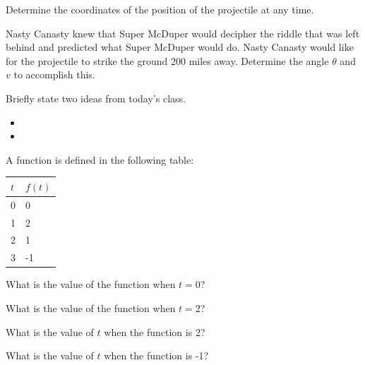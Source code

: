 \begin{problem}
\begin{subproblem}
    \vfill

  \item Determine the coordinates of the position of the projectile at
    any time.

    \vfill

    \clearpage

  \item Nasty Canasty knew that Super McDuper would decipher the
    riddle that was left behind and predicted what Super McDuper would
    do. Nasty Canasty would like for the projectile to strike the
    ground 200 miles away. Determine the angle $\theta$ and $v$ to
    accomplish this.

    \vfill

  \end{subproblem}

\end{problem}

\postClass

\begin{problem}
\item Briefly state two ideas from today's class.
  \begin{itemize}
  \item 
  \item 
  \end{itemize}
\item 
  \begin{subproblem}
    \item
  \end{subproblem}
\end{problem}



\begin{problem}
\item A function is defined in the following table:

  \begin{tabular}{l|l}
    $t$ & $f(t)$ \\ \hline 
    0 & 0 \\
    1 & 2 \\
    2 & 1 \\
    3 & -1 
  \end{tabular}

  \begin{subproblem}
  \item What is the value of the function when $t=0$?
    \vfill
  \item What is the value of the function when $t=2$?
    \vfill
  \item What is the value of $t$ when the function is 2?
    \vfill
  \item What is the value of $t$ when the function is -1?
    \vfill
  \end{subproblem}

\end{problem}



